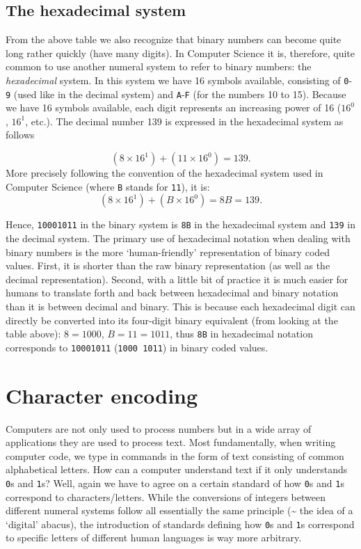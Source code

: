 \documentclass[
  12pt,
]{style/krantz}
\begin{document}
\hypertarget{the-hexadecimal-system}{%
\subsection{The hexadecimal system}\label{the-hexadecimal-system}}

From the above table we also recognize that binary numbers can become quite long rather quickly (have many digits). In Computer Science it is, therefore, quite common to use another numeral system to refer to binary numbers: the \emph{hexadecimal} system. In this system we have 16 symbols available, consisting of \texttt{0}-\texttt{9} (used like in the decimal system) and \texttt{A}-\texttt{F} (for the numbers 10 to 15). Because we have 16 symbols available, each digit represents an increasing power of 16 (\(16^{0}\), \(16^{1}\), etc.). The decimal number 139 is expressed in the hexadecimal system as follows

\[(8\times 16^1) +  (11\times 16^0) = 139.\]
More precisely following the convention of the hexadecimal system used in Computer Science (where \texttt{B} stands for \texttt{11}), it is:
\[(8\times 16^1) +  (B\times 16^0) = 8B = 139.\]

Hence, \texttt{10001011} in the binary system is \texttt{8B} in the hexadecimal system and \texttt{139} in the decimal system. The primary use of hexadecimal notation when dealing with binary numbers is the more `human-friendly' representation of binary coded values. First, it is shorter than the raw binary representation (as well as the decimal representation). Second, with a little bit of practice it is much easier for humans to translate forth and back between hexadecimal and binary notation than it is between decimal and binary. This is because each hexadecimal digit can directly be converted into its four-digit binary equivalent (from looking at the table above): \(8=1000\), \(B=11=1011\), thus \texttt{8B} in hexadecimal notation corresponds to \texttt{10001011} (\texttt{1000\ 1011}) in binary coded values.

\hypertarget{character-encoding}{%
\section{Character encoding}\label{character-encoding}}

Computers are not only used to process numbers but in a wide array of applications they are used to process text. Most fundamentally, when writing computer code, we type in commands in the form of text consisting of common alphabetical letters. How can a computer understand text if it only understands \texttt{0}s and \texttt{1}s? Well, again we have to agree on a certain standard of how \texttt{0}s and \texttt{1}s correspond to characters/letters. While the conversions of integers between different numeral systems follow all essentially the same principle (\textasciitilde{} the idea of a `digital' abacus), the introduction of standards defining how \texttt{0}s and \texttt{1}s correspond to specific letters of different human languages is way more arbitrary.
\end{document}
